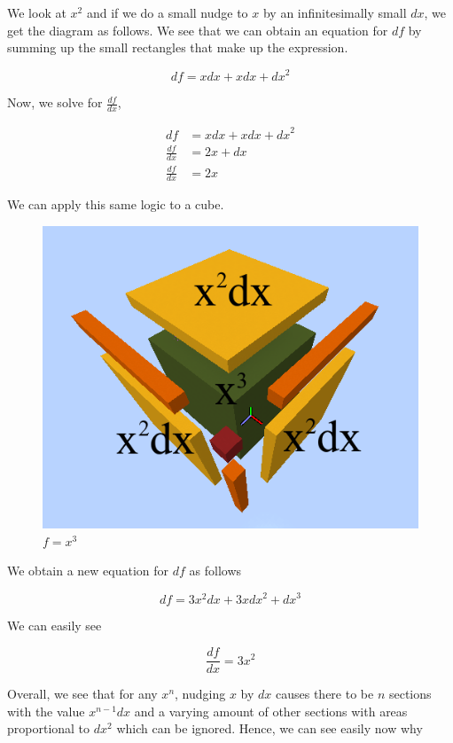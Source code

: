 \documentclass[a4paper,12pt,oneside]{book}
\begin{document}
 \noindent We look at $x^2$ and if we do a small nudge to $x$ by an infinitesimally small $dx$, we get the diagram as follows. We see that we can obtain an equation for $df$ by summing up the small rectangles that make up the expression.

$$df=xdx+xdx+{dx}^2$$

 \noindent Now, we solve for $\frac{df}{dx}$,
 
$$
\begin{aligned}
df&=xdx+xdx+{dx}^2\\
\frac{df}{dx}&=2x+dx\\
\frac{df}{dx}&=2x
\end{aligned}$$

\noindent We can apply this same logic to a cube.

\begin{figure}[H]
    \begin{center}
        \includegraphics[scale=0.75]{img/zayan/pr2.png}
        \caption{$f=x^3$}
        \label{fig:pr2}
    \end{center}
\end{figure}

\noindent We obtain a new equation for $df$ as follows

$$df = 3x^2dx+3x{dx}^2+{dx}^3$$

\noindent We can easily see

$$\frac{df}{dx}=3x^2$$

\noindent Overall, we see that for any $x^n$, nudging $x$ by $dx$ causes there to be $n$ sections with the value $x^{n-1}dx$ and a varying amount of other sections with areas proportional to $dx^2$ which can be ignored. Hence, we can see easily now why
\end{document}
